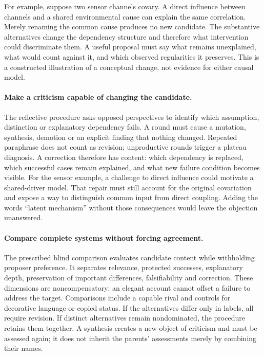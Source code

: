 For example, suppose two sensor channels covary. A direct influence between channels and a shared environmental cause can explain the same correlation. Merely renaming the common cause produces no new candidate. The substantive alternatives change the dependency structure and therefore what intervention could discriminate them. A useful proposal must say what remains unexplained, what would count against it, and which observed regularities it preserves. This is a constructed illustration of a conceptual change, not evidence for either causal model.

\paragraph{Make a criticism capable of changing the candidate.}
The reflective procedure asks opposed perspectives to identify which assumption, distinction or explanatory dependency fails. A round must cause a mutation, synthesis, demotion or an explicit finding that nothing changed. Repeated paraphrase does not count as revision; unproductive rounds trigger a plateau diagnosis. A correction therefore has content: which dependency is replaced, which successful cases remain explained, and what new failure condition becomes visible. For the sensor example, a challenge to direct influence could motivate a shared-driver model. That repair must still account for the original covariation and expose a way to distinguish common input from direct coupling. Adding the words ``latent mechanism'' without those consequences would leave the objection unanswered.

\paragraph{Compare complete systems without forcing agreement.}
The prescribed blind comparison evaluates candidate content while withholding proposer preference. It separates relevance, protected successes, explanatory depth, preservation of important differences, falsifiability and correction. These dimensions are noncompensatory: an elegant account cannot offset a failure to address the target. Comparisons include a capable rival and controls for decorative language or copied status. If the alternatives differ only in labels, all require revision. If distinct alternatives remain nondominated, the procedure retains them together. A synthesis creates a new object of criticism and must be assessed again; it does not inherit the parents' assessments merely by combining their names.

